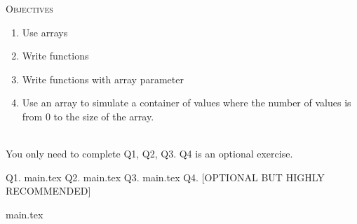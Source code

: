 


\renewcommand\TITLE{Assignment 13}
\usepackage{import}
\usepackage{array}


\topmatter

\textsc{Objectives}
 \begin{enumerate}
   \item Use arrays
   \item Write functions
   \item Write functions with array parameter
   \item Use an array to simulate a container of values where the number of
         values is from $0$ to the size of the array.
 \end{enumerate}
\mbox{}\\

You only need to complete Q1, Q2, Q3.
Q4 is an optional exercise.

\newpage Q1. {main.tex}
\newpage Q2. {main.tex}
\newpage Q3. {main.tex}
\newpage Q4. [OPTIONAL BUT HIGHLY RECOMMENDED]

{main.tex}


